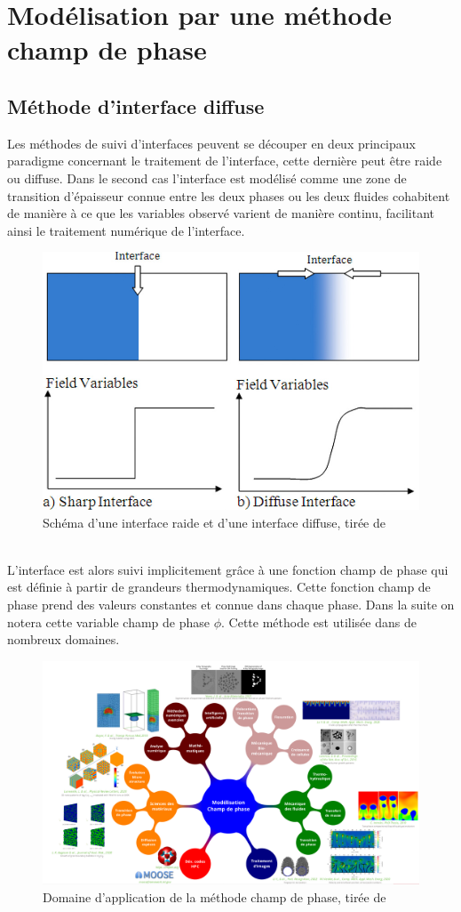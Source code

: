 \documentclass[a4paper,11pt,fleqn]{report}    %
\begin{document}
\chapter{Modélisation par une méthode champ de phase}
\section{Méthode d'interface diffuse}

Les méthodes de suivi d'interfaces peuvent se découper en deux principaux paradigme concernant le traitement de l'interface, cette dernière peut être raide ou diffuse. Dans le second cas l'interface est modélisé comme une zone de transition d'épaisseur connue entre les deux phases ou les deux fluides cohabitent de manière à ce que les variables observé varient de manière continu, facilitant ainsi le traitement numérique de l'interface.
\begin{figure}[h!]
	\centering
	\includegraphics[width=0.3\linewidth]{figure/diffuse_interface}
	\caption[Schéma d'une interface raide et d'une interface diffuse]{Schéma d'une interface raide et d'une interface diffuse, tirée de \cite{samkhaniani_evaluation_2017}}
	\label{fig:diffuseinterface}
\end{figure} \\
L'interface est alors suivi implicitement grâce à une fonction champ de phase qui est définie à partir de grandeurs thermodynamiques. Cette fonction champ de phase prend des valeurs constantes et connue dans chaque phase. Dans la suite on notera cette variable champ de phase $\phi$. Cette méthode est utilisée dans de nombreux domaines.


\begin{figure}[h!]
	\centering
	\includegraphics[width=0.9\linewidth]{figure/champ_phase}
	\caption[Domaine d'application de la méthode champ de phase]{Domaine d'application de la méthode champ de phase, tirée de \cite{introini_suivi_nodate}}
	\label{fig:champphase}
\end{figure} 
\end{document}
